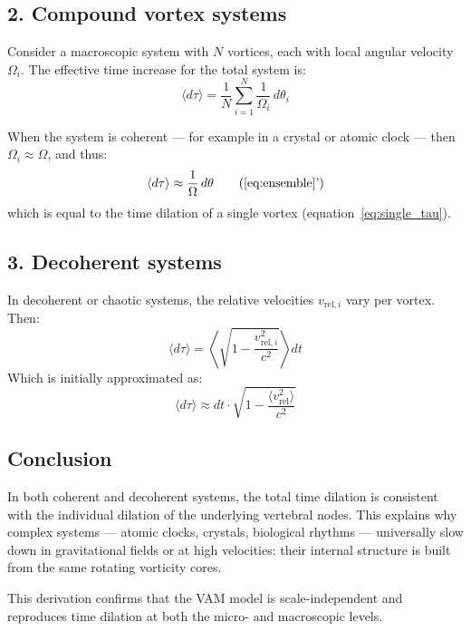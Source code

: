 \documentclass[a4paper,12pt]{article}
\begin{document}
\subsection*{2. Compound vortex systems}

Consider a macroscopic system with \( N \) vortices, each with local angular velocity \( \Omega_i \). The effective time increase for the total system is:
\begin{equation}
\langle d\tau \rangle = \frac{1}{N} \sum_{i=1}^{N} \frac{1}{\Omega_i} \, d\theta_i \label{eq:ensemble}
\end{equation}

When the system is coherent — for example in a crystal or atomic clock — then \( \Omega_i \approx \Omega \), and thus:
\begin{equation}
\langle d\tau \rangle \approx \frac{1}{\Omega} \, d\theta \tag{\ref{eq:ensemble}'}
\end{equation}
which is equal to the time dilation of a single vortex (equation~\ref{eq:single_tau}).

\subsection*{3. Decoherent systems}

In decoherent or chaotic systems, the relative velocities \( v_{\text{rel}, i} \) vary per vortex. Then:
\begin{equation}
\langle d\tau \rangle = \left\langle \sqrt{1 - \frac{v_{\text{rel}, i}^2}{c^2}} \right\rangle dt
\end{equation}
Which is initially approximated as:
\begin{equation}
\langle d\tau \rangle \approx dt \cdot \sqrt{1 - \frac{\langle v_\text{rel}^2 \rangle}{c^2}} \label{eq:average_dil}
\end{equation}

\subsection*{Conclusion}

In both coherent and decoherent systems, the total time dilation is consistent with the individual dilation of the underlying vertebral nodes. This explains why complex systems — atomic clocks, crystals, biological rhythms — universally slow down in gravitational fields or at high velocities: their internal structure is built from the same rotating vorticity cores.

\vspace{1em}
\noindent
This derivation confirms that the VAM model is scale-independent and reproduces time dilation at both the micro- and macroscopic levels.
\end{document}
